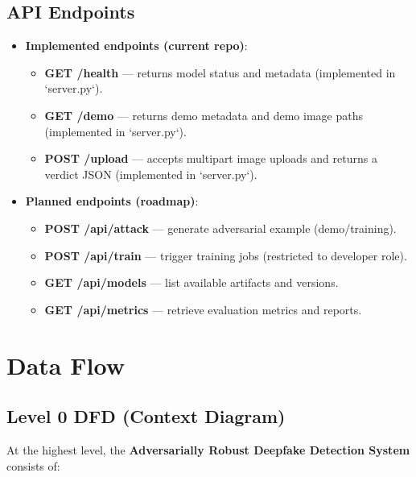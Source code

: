 \documentclass[a4paper,12pt]{article}
\begin{document}
\subsection{API Endpoints}
\begin{itemize}
    \item \textbf{Implemented endpoints (current repo)}:
    \begin{itemize}
        \item \textbf{GET /health} — returns model status and metadata (implemented in `server.py`).
        \item \textbf{GET /demo} — returns demo metadata and demo image paths (implemented in `server.py`).
        \item \textbf{POST /upload} — accepts multipart image uploads and returns a verdict JSON (implemented in `server.py`).
    \end{itemize}
    \item \textbf{Planned endpoints (roadmap)}:
    \begin{itemize}
        \item \textbf{POST /api/attack} — generate adversarial example (demo/training).
        \item \textbf{POST /api/train} — trigger training jobs (restricted to developer role).
        \item \textbf{GET /api/models} — list available artifacts and versions.
        \item \textbf{GET /api/metrics} — retrieve evaluation metrics and reports.
    \end{itemize}
\end{itemize}

\section{Data Flow}

\subsection{Level 0 DFD (Context Diagram)}
At the highest level, the \textbf{Adversarially Robust Deepfake Detection System} consists of:
\end{document}
